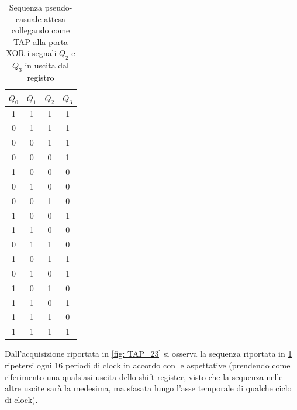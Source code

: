 \documentclass[10pt, a4paper, italian]{article}
\begin{document}
\begin{table}[htbp]
\centering
\begin{tabular}{cccc}
\toprule
$Q_0$ & $Q_1$ & $Q_2$ & $Q_3$ \\
\midrule
\midrule
1 & 1 & 1 & 1 \\
0 & 1 & 1 & 1 \\
0 & 0 & 1 & 1 \\
0 & 0 & 0 & 1 \\
1 & 0 & 0 & 0 \\
0 & 1 & 0 & 0 \\
0 & 0 & 1 & 0 \\
1 & 0 & 0 & 1 \\
1 & 1 & 0 & 0 \\
0 & 1 & 1 & 0 \\
1 & 0 & 1 & 1 \\
0 & 1 & 0 & 1 \\
1 & 0 & 1 & 0 \\
1 & 1 & 0 & 1 \\
1 & 1 & 1 & 0 \\
1 & 1 & 1 & 1 \\
\bottomrule
\end{tabular}
\caption{Sequenza pseudo-casuale attesa collegando come TAP alla porta XOR i
segnali $Q_2$ e $Q_3$ in uscita dal registro
\label{tab: pseudo}}
\end{table}
Dall'acquisizione riportata in \cref{fig: TAP_23} si osserva la sequenza
riportata in \cref{tab: pseudo} ripetersi ogni 16 periodi di clock in accordo
con le aspettative (prendendo come riferimento una qualsiasi uscita dello
shift-register, visto che la sequenza nelle altre uscite sarà la medesima, ma
sfasata lungo l'asse temporale di qualche ciclo di clock).
\end{document}
